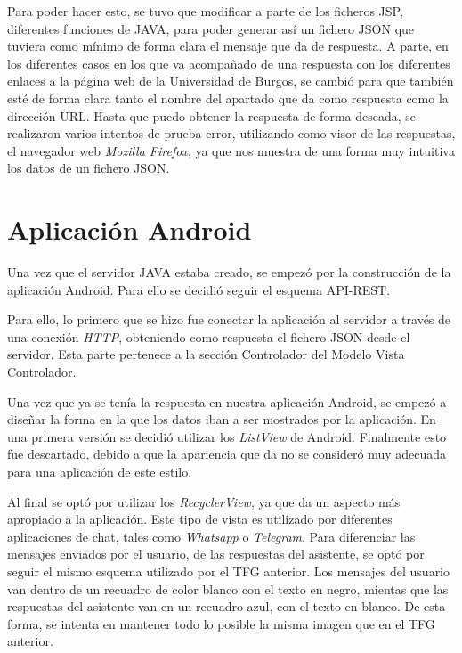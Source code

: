 Para poder hacer esto, se tuvo que modificar a parte de los ficheros JSP, diferentes funciones de JAVA, para poder generar así un fichero JSON que tuviera como mínimo de forma clara el mensaje que da de respuesta. A parte, en los diferentes casos en los que va acompañado de una respuesta con los diferentes enlaces a la página web de la Universidad de Burgos, se cambió para que también esté de forma clara tanto el nombre del apartado que da como respuesta como la dirección URL. Hasta que puedo obtener la respuesta de forma deseada, se realizaron varios intentos de prueba error, utilizando como visor de las respuestas, el navegador web \textit{Mozilla Firefox}, ya que nos muestra de una forma muy intuitiva los datos de un fichero JSON.

\section{Aplicación Android}

Una vez que el servidor JAVA estaba creado, se empezó por la construcción de la aplicación Android. Para ello se decidió seguir el esquema API-REST.


Para ello, lo primero que se hizo fue conectar la aplicación al servidor a través de una conexión \textit{HTTP}, obteniendo como respuesta el fichero JSON desde el servidor. Esta parte pertenece a la sección Controlador del Modelo Vista Controlador.

Una vez que ya se tenía la respuesta en nuestra aplicación Android, se empezó a diseñar la forma en la que los datos iban a ser mostrados por la aplicación. En una primera versión se decidió utilizar los \textit{ListView} de Android. Finalmente esto fue descartado, debido a que la apariencia que da no se consideró muy adecuada para una aplicación de este estilo.


Al final se optó por utilizar los \textit{RecyclerView}, ya que da un aspecto más apropiado a la aplicación. Este tipo de vista es utilizado por diferentes aplicaciones de chat, tales como \textit{Whatsapp} o \textit{Telegram}. Para diferenciar las mensajes enviados por el usuario, de las respuestas del asistente, se optó por seguir el mismo esquema utilizado por el TFG anterior. Los mensajes del usuario van dentro de un recuadro de color blanco con el texto en negro, mientas que las respuestas del asistente van en un recuadro azul, con el texto en blanco. De esta forma, se intenta en mantener todo lo posible la misma imagen que en el TFG anterior.

